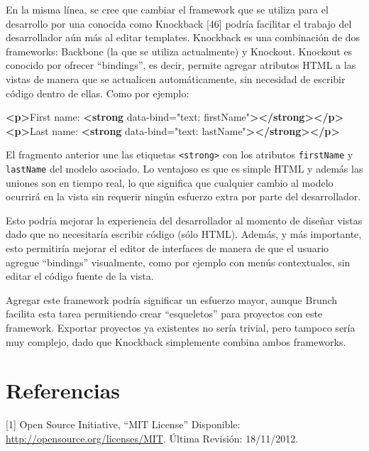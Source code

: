 \documentclass[12pt,spanish,letter]{report}
\newenvironment{Shaded}{}{}
\newcommand{\KeywordTok}[1]{\textcolor[rgb]{0.00,0.44,0.13}{\textbf{{#1}}}}
\newcommand{\StringTok}[1]{\textcolor[rgb]{0.25,0.44,0.63}{{#1}}}
\newcommand{\OtherTok}[1]{\textcolor[rgb]{0.00,0.44,0.13}{{#1}}}
\newcommand{\NormalTok}[1]{{#1}}
\begin{document}
En la misma línea, se cree que cambiar el framework que se utiliza para
el desarrollo por una conocida como Knockback {[}46{]} podría facilitar
el trabajo del desarrollador aún más al editar templates. Knockback es
una combinación de dos frameworks: Backbone (la que se utiliza
actualmente) y Knockout. Knockout es conocido por ofrecer ``bindings'',
es decir, permite agregar atributos HTML a las vistas de manera que se
actualicen automáticamente, sin necesidad de escribir código dentro de
ellas. Como por ejemplo:

\begin{Shaded}
\begin{Highlighting}[]
\KeywordTok{<p>}\NormalTok{First name: }\KeywordTok{<strong}\OtherTok{ data-bind=}\StringTok{"text: firstName"}\KeywordTok{></strong></p>}
\KeywordTok{<p>}\NormalTok{Last name: }\KeywordTok{<strong}\OtherTok{ data-bind=}\StringTok{"text: lastName"}\KeywordTok{></strong></p>}
\end{Highlighting}
\end{Shaded}

El fragmento anterior une las etiquetas
\texttt{\textless{}strong\textgreater{}} con los atributos
\texttt{firstName} y \texttt{lastName} del modelo asociado. Lo ventajoso
es que es simple HTML y además las uniones son en tiempo real, lo que
significa que cualquier cambio al modelo ocurrirá en la vista sin
requerir ningún esfuerzo extra por parte del desarrollador.

Esto podría mejorar la experiencia del desarrollador al momento de
diseñar vistas dado que no necesitaría escribir código (sólo HTML).
Además, y más importante, esto permitiría mejorar el editor de
interfaces de manera de que el usuario agregue ``bindings'' visualmente,
como por ejemplo con menús contextuales, sin editar el código fuente de
la vista.

Agregar este framework podría significar un esfuerzo mayor, aunque
Brunch facilita esta tarea permitiendo crear ``esqueletos'' para
proyectos con este framework. Exportar proyectos ya existentes no sería
trivial, pero tampoco sería muy complejo, dado que Knockback simplemente
combina ambos frameworks.

\clearpage
\newpage

\chapter{Referencias}

{[}1{]} Open Source Initiative, ``MIT License'' Disponible:
\href{http://opensource.org/licenses/MIT}{http://opensource.org/licenses/MIT}.
Última Revisión: 18/11/2012.
\end{document}

